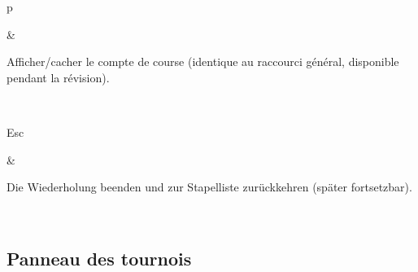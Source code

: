 \documentclass[letterpaper,10pt,german]{sphinxmanual}
\begin{document}
\begin{savenotes}
\begin{tabular}[t]{}
\begin{varwidth}[t]{}
\sphinxAtStartPar
p
\sphinxbeforeendvarwidth
\end{varwidth}%
&\begin{varwidth}[t]{}
\sphinxAtStartPar
Afficher/cacher le compte de course (identique au raccourci général, disponible pendant la révision).
\sphinxbeforeendvarwidth
\end{varwidth}%
\\
\sphinxhline\begin{varwidth}[t]{}
\sphinxAtStartPar
Esc
\sphinxbeforeendvarwidth
\end{varwidth}%
&\begin{varwidth}[t]{}
\sphinxAtStartPar
Die Wiederholung beenden und zur Stapelliste zurückkehren (später fortsetzbar).
\sphinxbeforeendvarwidth
\end{varwidth}%
\\
\sphinxbottomrule
\end{tabular}
\sphinxtableafterendhook\par
\sphinxattableend\end{savenotes}


\subsection{Panneau des tournois}
\label{\detokenize{raccourcis:panneau-des-tournois}}\label{\detokenize{raccourcis:raccourcis-tournament-panel}}
\end{document}
